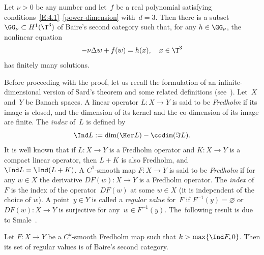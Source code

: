 \label{S:5.3}

\begin{proposition}\label{P:5.3}
Let $\nu>0$ be any number and let~$f$ be a real polynomial satisfying conditions~\eqref{E:4.1}--\eqref{power-dimension} with~$d=3$. Then there is a subset $\GG_\nu\subset H^1(\T^3)$ of Baire's second category such that, for any $h\in \GG_\nu$, the nonlinear equation\vspace*{-3pt}
\begin{equation} \label{stationary-eq3}
-\nu\Delta w+f(w)=h(x), \quad x\in\T^3
\end{equation}
has finitely many solutions.
\end{proposition}

Before proceeding with the proof, let us recall the formulation of an infinite-dimensional version of Sard's theorem and some related definitions (see~\cite{smale-1965}). Let~$X$ and~$Y$ be Banach spaces. A linear operator $L:X\to Y$ is said to be \emph{Fredholm} if its image is closed, and the dimension of its kernel and the co-dimension of its image are finite. The \emph{index} of~$L$ is defined by
\[
\Ind L:= \dim (\Ker L)- \codim(\Im L).
\]
It is well known that if $L:X\to Y$ is a Fredholm operator and $K:X\to Y$ is a compact linear operator, then $L+K$ is also Fredholm, and $\Ind L=\Ind(L+K)$. A $C^1$-smooth map $F:X\to Y$ is said to be \emph{Fredholm} if for any $w\in X$ the derivative $DF(w):X\to Y$ is a Fredholm operator. The \emph{index} of~$F$ is the index of the operator~$DF(w)$ at some $w\in X$ (it is independent of the choice of $w$). A point~$y\in Y$ is called a \emph{regular value} for~$F$ if $F^{-1}(y)=\varnothing$ or $DF(w):X\to Y$ is surjective for any~$w\in F^{-1}(y)$. The~following result is due to Smale~\cite[Cor.\,1.5]{smale-1965}.

\begin{theorem}\label{T:5.4}
Let $F:X\to Y$ be a $C^k$-smooth Fredholm map such that $k>\max \{\Ind F,0\}$. Then its set of regular values is of Baire's second category.
\end{theorem}


